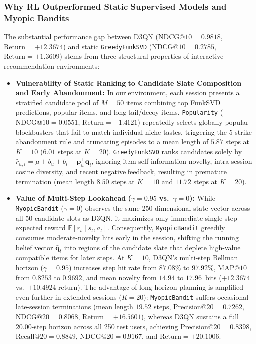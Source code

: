 \subsubsection{Why RL Outperformed Static Supervised Models and Myopic Bandits}
The substantial performance gap between D3QN ($\text{NDCG@10} = 0.9818$, $\text{Return} = +12.3674$) and static \texttt{GreedyFunkSVD} ($\text{NDCG@10} = 0.2785$, $\text{Return} = +1.3609$) stems from three structural properties of interactive recommendation environments:
\begin{itemize}
    \item \textbf{Vulnerability of Static Ranking to Candidate Slate Composition and Early Abandonment:} In our environment, each session presents a stratified candidate pool of $M=50$ items combining top FunkSVD predictions, popular items, and long-tail/decoy items. \texttt{Popularity} ($\text{NDCG@10} = 0.0551$, $\text{Return} = -1.4121$) repeatedly selects globally popular blockbusters that fail to match individual niche tastes, triggering the 5-strike abandonment rule and truncating episodes to a mean length of $5.87$ steps at $K=10$ ($6.01$ steps at $K=20$). \texttt{GreedyFunkSVD} ranks candidates solely by $\hat{r}_{u,i} = \mu + b_u + b_i + \mathbf{p}_u^\top \mathbf{q}_i$, ignoring item self-information novelty, intra-session cosine diversity, and recent negative feedback, resulting in premature termination (mean length $8.50$ steps at $K=10$ and $11.72$ steps at $K=20$).
    \item \textbf{Value of Multi-Step Lookahead ($\gamma = 0.95$ vs.\ $\gamma = 0$):} While \texttt{MyopicBandit} ($\gamma=0$) observes the same 250-dimensional state vector across all 50 candidate slots as D3QN, it maximizes only immediate single-step expected reward $\mathbb{E}[r_t \mid s_t, a_t]$. Consequently, \texttt{MyopicBandit} greedily consumes moderate-novelty hits early in the session, shifting the running belief vector $\bar{\mathbf{q}}_t$ into regions of the candidate slate that deplete high-value compatible items for later steps. At $K=10$, D3QN's multi-step Bellman horizon ($\gamma=0.95$) increases step hit rate from $87.08\%$ to $97.92\%$, $\text{MAP@10}$ from $0.8253$ to $0.9692$, and mean novelty from $14.94$ to $17.96$~bits ($+12.3674$ vs.\ $+10.4924$ return). The advantage of long-horizon planning is amplified even further in extended sessions ($K=20$): \texttt{MyopicBandit} suffers occasional late-session terminations (mean length $19.52$ steps, $\text{Precision@20} = 0.7262$, $\text{NDCG@20} = 0.8068$, $\text{Return} = +16.5601$), whereas D3QN sustains a full $20.00$-step horizon across all 250 test users, achieving $\text{Precision@20} = 0.8398$, $\text{Recall@20} = 0.8849$, $\text{NDCG@20} = 0.9167$, and $\text{Return} = +20.1006$.
\end{itemize}

